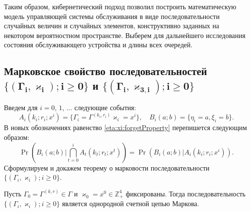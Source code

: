 \documentclass[a4paper,12pt,russian]{extarticle}
\newcommand{\Mark}{\{(\Gamma_i, \varkappa_i); i \geqslant 0\}}
\newcommand{\MarkThree}{\{(\Gamma_i, \varkappa_{3,i}); i \geqslant 0\}}
\begin{document}
Таким образом, кибернетический подход позволил построить математическую модель управляющей системы обслуживания в виде последовательности случайных величин и случайных элементов, конструктивно заданных на некотором вероятностном пространстве. Выберем для дальнейшего исследования состояния обслуживающего устройства и длины всех очередей.

\subsection[Марковское свойство последовательностей $\boldsymbol{\Mark}$ и $\boldsymbol{\MarkThree}$]%
{Марковское свойство последовательностей \\ $\boldsymbol{\Mark}$ и $\boldsymbol{\MarkThree}$}

Введем для $i=0$, $1$, $\ldots$ следующие события:
\begin{equation*}
A_i(k_i;r_i;x^i) = \{\Gamma_i=\Gamma^{(k_i,r_i)}\varkappa_i=x^i\}, \quad  B_i(a;b) = \{\eta_i=a, \xi_i=b\}.
\end{equation*}
В новых обозначениях равенство \eqref{eta:xi:forgetProperty}  перепишется следующим образом:
\begin{equation}
\Pr (B_i(a;b) | \bigcap_{t=0}^{i} A_t(k_t;r_t;x^t)) = \Pr (B_i(a;b) |  A_i(k_i;r_i;x^i)).
\label{new:notation:eta:xi:forget}
\end{equation}
Сформулируем и докажем теорему о марковости последовательности \linebreak$\Mark$.
\begin{theorem}
Пусть $\Gamma_0=\Gamma^{(k,r)}\in \Gamma$ и $\varkappa_0=x^0\in \mathbb{Z}_+^4$ фиксированы. Тогда последовательность $\Mark$ является однородной счетной цепью Маркова. 
\end{theorem}
\end{document}
